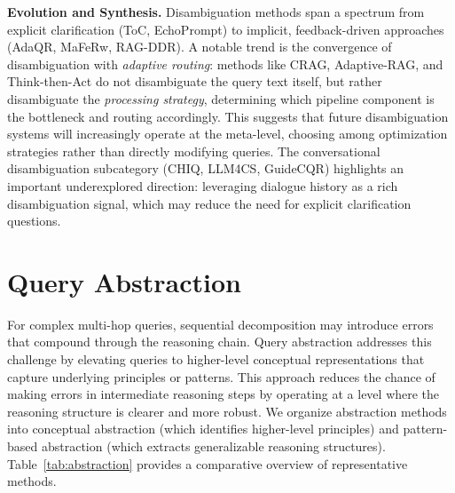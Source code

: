 \documentclass{article}
\begin{document}
\textbf{Evolution and Synthesis.} Disambiguation methods span a spectrum from explicit clarification (ToC, EchoPrompt) to implicit, feedback-driven approaches (AdaQR, MaFeRw, RAG-DDR). A notable trend is the convergence of disambiguation with \textit{adaptive routing}: methods like CRAG, Adaptive-RAG, and Think-then-Act do not disambiguate the query text itself, but rather disambiguate the \textit{processing strategy}, determining which pipeline component is the bottleneck and routing accordingly. This suggests that future disambiguation systems will increasingly operate at the meta-level, choosing among optimization strategies rather than directly modifying queries. The conversational disambiguation subcategory (CHIQ, LLM4CS, GuideCQR) highlights an important underexplored direction: leveraging dialogue history as a rich disambiguation signal, which may reduce the need for explicit clarification questions.

\section{Query Abstraction}\label{sec:abstraction}

For complex multi-hop queries, sequential decomposition may introduce errors that compound through the reasoning chain. Query abstraction addresses this challenge by elevating queries to higher-level conceptual representations that capture underlying principles or patterns. This approach reduces the chance of making errors in intermediate reasoning steps by operating at a level where the reasoning structure is clearer and more robust. We organize abstraction methods into conceptual abstraction (which identifies higher-level principles) and pattern-based abstraction (which extracts generalizable reasoning structures). Table~\ref{tab:abstraction} provides a comparative overview of representative methods.

\vspace{0.3em}
\noindent{}
\vspace{0.3em}
\end{document}
